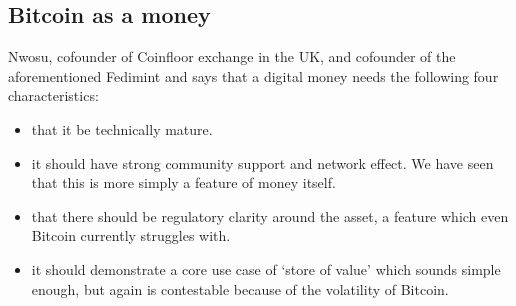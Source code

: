 \begin{itemize}
\section{Bitcoin as a money}
Nwosu, cofounder of Coinfloor exchange in the UK, and cofounder of the aforementioned Fedimint and says that a digital money needs the following four characteristics:
\begin{itemize}
\item that it be technically mature. %
\item it should have strong community support and network effect. We have seen that this is more simply a feature of money itself.
\item that there should be regulatory clarity around the asset, a feature which even Bitcoin currently struggles with.
\item it should demonstrate a core use case of `store of value' which sounds simple enough, but again is contestable because of the volatility of Bitcoin.
\end{itemize}

\end{itemize}
